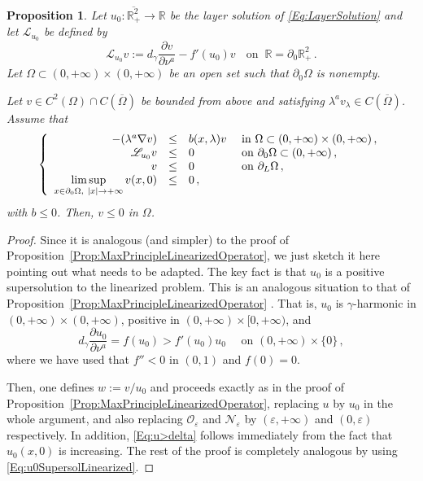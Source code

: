 \documentclass[twoside,leqno,symbols-for-thanks, draft]{rmi}
\numberwithin{equation}{section}
\newtheorem{proposition}[theorem]{Proposition}
\theoremstyle{definition}
\newcommand{\con}[1]{\mathbb{#1}}
\newcommand{\R}{\con{R}} %
\newcommand{\ncal}{\mathcal{N}}
\newcommand{\ocal}{\mathcal{O}}
\newcommand{\s}{\gamma}
\newcommand\beqc[1]{\left\{\begin{array}{#1}}
\newcommand\eeqc{\end{array} \right.}
\def\PDEsystem{rcll}
\let\div\relax
\DeclareMathOperator{\div}{div}
\def\ds{\displaystyle}
\begin{document}
\begin{proposition}
	\label{Prop:MaxPrincipleLinearizedOperator2D}
	Let $u_0:\overline{\R^2_+}\to \R$ be the layer solution of \eqref{Eq:LayerSolution} and let $\mathscr{L}_{u_0} $ be defined by 
	$$
	\mathscr{L}_{u_0} v := d_\s \dfrac{\partial v}{\partial \nu^a}  -f'(u_0) v\,\ \ \text{ on } \ \R=\partial_0\R^2_+\,.
	$$
	Let $\Omega \subset (0,+\infty) \times (0,+\infty)$ be an open set such that $\partial_0 \Omega$ is nonempty. 
	
	Let $v \in C^2 (\Omega)\cap C(\overline{\Omega})$ be bounded from above and satisfying $\lambda^a v_\lambda \in C (\overline{\Omega})$. Assume that
	$$
	\beqc{\PDEsystem}
	-\div(\lambda^a \nabla v) &\leq& b(x,\lambda) v & \text{ in } \Omega \subset (0, +\infty)\times (0,+\infty)\,, \\
	\mathscr{L}_{u_0} v &\leq & 0 & \text{ on } \partial_0 \Omega \subset (0,+\infty) \,, \\
	v & \leq & 0 & \text{ on } \partial_L \Omega\,,\\
	\ds \limsup_{x\in \partial_0 \Omega,\ |x|\to +\infty} v(x,0) & \leq & 0\,,
	\eeqc
	$$
	with $b \leq 0$. Then, $v\leq 0$ in $\Omega$.
\end{proposition}

\begin{proof}
	Since it is analogous (and simpler) to the proof of Proposition~\ref{Prop:MaxPrincipleLinearizedOperator}, we just sketch it here pointing out what needs to be adapted. The key fact is that $u_0$ is a positive supersolution to the linearized problem. This is an analogous situation to that of Proposition~\ref{Prop:MaxPrincipleLinearizedOperator} . That is, $u_0$ is $\s$-harmonic in $(0,+\infty)\times (0,+\infty)$, positive in $(0,+\infty)\times [0,+\infty)$, and
	\begin{equation}
	\label{Eq:u0SupersolLinearized}
	d_\s \dfrac{\partial u_0}{\partial \nu^a}  = f(u_0) > f'(u_0) u_0 \quad \textrm{ on } (0, +\infty)\times \{0\}\,,
	\end{equation}
	where we have used that $f''<0$ in $(0,1)$ and $f(0)=0$.
	
	
	Then, one defines $w := v/u_0$ and proceeds exactly as in the proof of Proposition~\ref{Prop:MaxPrincipleLinearizedOperator}, replacing  $u$ by $u_0$ in the whole argument, and also replacing  $\ocal_\varepsilon$ and $\ncal_\varepsilon$ by $(\varepsilon,+\infty)$ and $(0,\varepsilon)$ respectively. In addition, \eqref{Eq:u>delta} follows immediately from the fact that $u_0(x,0)$ is increasing. The rest of the proof is completely analogous by using \eqref{Eq:u0SupersolLinearized}.
\end{proof}
\end{document}

